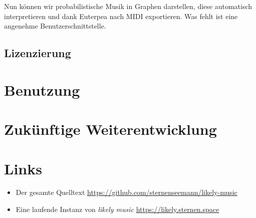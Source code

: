 \documentclass[a4paper,twocolumn]{article}
\begin{document}
Nun können wir probabilistische Musik in Graphen darstellen, diese automatisch
interpretieren und dank Euterpea nach MIDI exportieren. Was fehlt ist eine
angenehme Benutzerschnittstelle.

\subsection*{Lizenzierung}

\section*{Benutzung}

\section*{Zukünftige Weiterentwicklung}

\section*{Links}

\begin{itemize}
\item Der gesamte Quelltext \url{https://github.com/sternenseemann/likely-music}
\item Eine laufende Instanz von {\it likely music} \url{https://likely.sternen.space}
\end{itemize}
\end{document}
